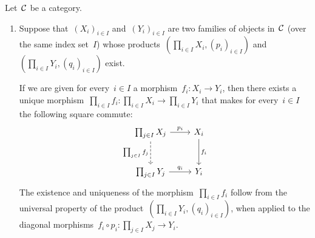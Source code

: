 

\begin{remark*}
  \label{functoriality of (co)product}
  Let~$\mathcal{C}$ be a category.
  \begin{enumerate}
    \item
      Suppose that~$(X_i)_{i \in I}$ and~$(Y_i)_{i \in I}$ are two families of objects in~$\mathcal{C}$ (over the same index set~$I$) whose products~$(\prod_{i \in I} X_i, (p_i)_{i \in I})$ and~$(\prod_{i \in I} Y_i, (q_i)_{i \in I})$ exist.
      
      If we are given for every~$i \in I$ a morphism~$f_i \colon X_i \to Y_i$, then there exists a unique morphism~$\prod_{i \in I} f_i \colon \prod_{i \in I} X_i \to \prod_{i \in I} Y_i$ that makes for every~$i \in I$ the following square commute:
      \[
        \begin{tikzcd}[row sep = large]
            \prod_{j \in I} X_j
            \arrow{r}[above]{p_i}
            \arrow[dashed]{d}[left]{\prod_{j \in I} f_j}
          & X_i
            \arrow{d}[right]{f_i}
          \\
            \prod_{j \in I} Y_j
            \arrow{r}[above]{q_i}
          & Y_i
        \end{tikzcd}
      \]
      The existence and uniqueness of the morphism~$\prod_{i \in I} f_i$ follow from the universal property of the product~$(\prod_{i \in I} Y_i, (q_i)_{i \in I})$, when applied to the diagonal morphisms~$f_i \circ p_i \colon \prod_{j \in I} X_j \to Y_i$.
      

\end{enumerate}
\end{remark*}

